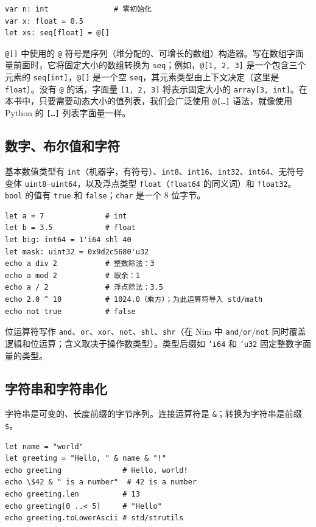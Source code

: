 \documentclass[justified, sixbynine]{tufte-book}
\def\ft{\small\tt}
\theoremstyle{plain}%
\newtheorem * {corollary}{推论}
\theoremstyle{definition}
\theoremstyle{remark}
\newtheorem * {remark}{注记}
\newtheorem * {note}{注释}
\begin{document}
\begin{fullwidth}
\begin{lstlisting}
var n: int               # 零初始化
var x: float = 0.5
let xs: seq[float] = @[]
\end{lstlisting}

{\ft @[]} 中使用的 {\ft @} 符号是序列（堆分配的、可增长的数组）构造器。写在数组字面量前面时，它将固定大小的数组转换为 {\ft seq}；例如，{\ft @[1, 2, 3]} 是一个包含三个元素的 {\ft seq[int]}，{\ft @[]} 是一个空 {\ft seq}，其元素类型由上下文决定（这里是 {\ft float}）。没有 {\ft @} 的话，字面量 {\ft [1, 2, 3]} 将表示固定大小的 {\ft array[3, int]}。在本书中，只要需要动态大小的值列表，我们会广泛使用 {\ft @[\dots]} 语法，就像使用 Python 的 {\ft [\dots]} 列表字面量一样。

\goodbreak\subsection{数字、布尔值和字符}


基本数值类型有 {\ft int}（机器字，有符号）、{\ft int8}、{\ft int16}、{\ft int32}、{\ft int64}、无符号变体 {\ft uint8}--{\ft uint64}，以及浮点类型 {\ft float}（{\ft float64} 的同义词）和 {\ft float32}。{\ft bool} 的值有 {\ft true} 和 {\ft false}；{\ft char} 是一个 8 位字节。

\begin{lstlisting}
let a = 7              # int
let b = 3.5            # float
let big: int64 = 1'i64 shl 40
let mask: uint32 = 0x9d2c5680'u32
echo a div 2           # 整数除法：3
echo a mod 2           # 取余：1
echo a / 2             # 浮点除法：3.5
echo 2.0 ^ 10          # 1024.0（乘方）；为此运算符导入 std/math
echo not true          # false
\end{lstlisting}

位运算符写作 {\ft and}、{\ft or}、{\ft xor}、{\ft not}、{\ft shl}、{\ft shr}（在 Nim 中 {\ft and}/{\ft or}/{\ft not} 同时覆盖逻辑和位运算；含义取决于操作数类型）。类型后缀如 {\ft 'i64} 和 {\ft 'u32} 固定整数字面量的类型。

\goodbreak\subsection{字符串和字符串化}


字符串是可变的、长度前缀的字节序列。连接运算符是 {\ft \&}；转换为字符串是前缀 {\ft \$}。

\begin{lstlisting}
let name = "world"
let greeting = "Hello, " & name & "!"
echo greeting              # Hello, world!
echo \$42 & " is a number"  # 42 is a number
echo greeting.len          # 13
echo greeting[0 ..< 5]     # "Hello"
echo greeting.toLowerAscii # std/strutils
\end{lstlisting}


\end{fullwidth}
\end{document}
